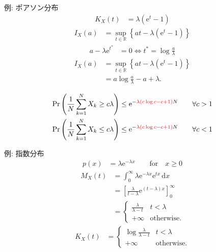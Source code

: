 \documentclass[lualatex,handout]{beamer}
\newcommand{\emm}[1]{\textcolor{red}{#1}}
\newcommand\dx{{\,\mathrm{d}x}}
\theoremstyle{definition}
\begin{document}
\begin{frame}{例: ポアソン分布}
\begin{align*}
K_X(t) &= \lambda(\mathrm{e}^t-1)
\end{align*}
\begin{align*}
I_X(a)&=\sup_{t\in\mathbb{R}}\left\{at - \lambda(\mathrm{e}^t-1)\right\}
\end{align*}
\begin{align*}
a-\lambda\mathrm{e}^{t^*} &= 0\iff t^* = \log \frac{a}{\lambda}
\end{align*}
\begin{align*}
I_X(a)&=\sup_{t\in\mathbb{R}}\left\{at - \lambda(\mathrm{e}^t-1)\right\}\\
 &= a\log\frac{a}{\lambda} -a + \lambda.
\end{align*}

\vspace{.5em}
\begin{align*}
\Pr\left(\frac1N\sum_{k=1}^N X_k \ge c\lambda\right) &\le \mathrm{e}^{-\emm{\lambda\left(c\log c -c + 1 \right)}N}\qquad\forall c > 1\\
\Pr\left(\frac1N\sum_{k=1}^N X_k \le c\lambda\right) &\le \mathrm{e}^{-\emm{\lambda\left(c\log c -c + 1 \right)}N}\qquad\forall c < 1\\
\end{align*}
\end{frame}

\begin{frame}{例: 指数分布}
\begin{align*}
p(x) &= \lambda\mathrm{e}^{-\lambda x}\qquad\text{for}\quad x\ge 0
\end{align*}
\begin{align*}
M_X(t) &= \int_{0}^\infty \lambda\mathrm{e}^{-\lambda x} \mathrm{e}^{tx}\dx\\
&=\left[\frac{\lambda}{t-\lambda}\mathrm{e}^{(t-\lambda)x}\right]_0^{\infty}\\
&=\begin{cases}
\frac{\lambda}{\lambda-t}& t < \lambda\\
+\infty&\text{otherwise.}
\end{cases}
\end{align*}
\begin{align*}
K_X(t) &=
\begin{cases}
\log\frac{\lambda}{\lambda-t}& t < \lambda\\
+\infty&\text{otherwise.}
\end{cases}
\end{align*}
\end{frame}
\end{document}
